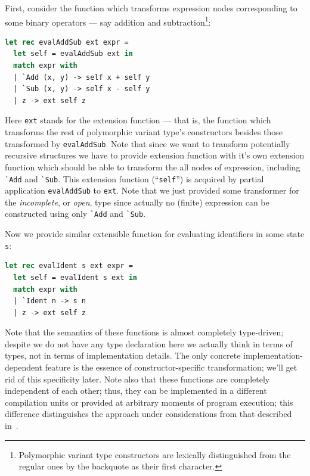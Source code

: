 First, consider the function which transforms expression nodes corresponding to some binary 
operators --- say addition and subtraction\footnote{Polymorphic variant type constructors are 
lexically distinguished from the regular ones by the backquote as their first character.}:

\begin{lstlisting}[language=ocaml]
let rec evalAddSub ext expr =
  let self = evalAddSub ext in
  match expr with
  | `Add (x, y) -> self x + self y
  | `Sub (x, y) -> self x - self y
  | z -> ext self z
\end{lstlisting}

Here \lstinline{ext} stands for the extension function --- that is, the function which
transforms the rest of polymorphic variant type's constructors besides those transformed 
by \lstinline{evalAddSub}. Note that since we want to transform potentially recursive 
structures we have to provide extension function with it's own extension function which 
should be able to transform the all nodes of expression, including \lstinline{`Add} and
\lstinline{`Sub}. This extension function (``\lstinline{self}'') is acquired by partial
application \lstinline{evalAddSub} to \lstinline{ext}. Note that we just provided some 
transformer for the \emph{incomplete}, or \emph{open}, type since actually no (finite) 
expression can be constructed using only \lstinline{`Add} and \lstinline{`Sub}. 

Now we provide similar extensible function for evaluating identifiers in some state 
\lstinline{s}:

\begin{lstlisting}[language=ocaml]
let rec evalIdent s ext expr =
  let self = evalIdent s ext in
  match expr with
  | `Ident n -> s n
  | z -> ext self z
\end{lstlisting}

Note that the semantics of these functions is almost completely type-driven; despite
we do not have any type declaration here we actually think in terms of types, not
in terms of implementation details. The only concrete implementation-dependent feature
is the essence of constructor-specific transformation; we'll get rid of this specificity 
later. Note also that these functions are completely independent of each other; thus, they 
can be implemented in a different compilation units or provided at arbitrary moments of 
program execution; this difference distinguishes the approach under considerations from that 
described in~\cite{PVReuse}.

